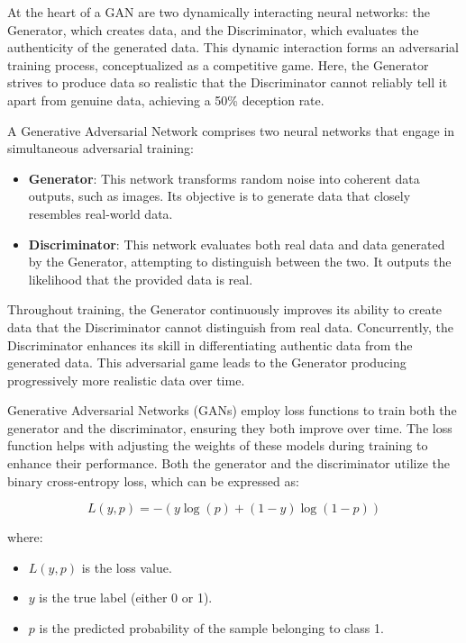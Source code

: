 \documentclass[12pt,a4paper]{report}
\begin{document}
At the heart of a GAN are two dynamically interacting neural networks: the Generator, which creates data, and the Discriminator, which evaluates the authenticity of the generated data. This dynamic interaction forms an adversarial training process, conceptualized as a competitive game. Here, the Generator strives to produce data so realistic that the Discriminator cannot reliably tell it apart from genuine data, achieving a 50\% deception rate.

A Generative Adversarial Network comprises two neural networks that engage in simultaneous adversarial training:

\begin{itemize}
  \item \textbf{Generator}: This network transforms random noise into coherent data outputs, such as images. Its objective is to generate data that closely resembles real-world data.
  \item \textbf{Discriminator}: This network evaluates both real data and data generated by the Generator, attempting to distinguish between the two. It outputs the likelihood that the provided data is real.
\end{itemize}

Throughout training, the Generator continuously improves its ability to create data that the Discriminator cannot distinguish from real data. Concurrently, the Discriminator enhances its skill in differentiating authentic data from the generated data. This adversarial game leads to the Generator producing progressively more realistic data over time.

Generative Adversarial Networks (GANs) employ loss functions to train both the generator and the discriminator, ensuring they both improve over time. The loss function helps with adjusting the weights of these models during training to enhance their performance. Both the generator and the discriminator utilize the binary cross-entropy loss, which can be expressed as:

\begin{equation}
  L(y, p) = - (y \log(p) + (1 - y) \log(1 - p))
\end{equation}

where:
\begin{itemize}
  \item \( L(y, p) \) is the loss value.
  \item \( y \) is the true label (either 0 or 1).
  \item \( p \) is the predicted probability of the sample belonging to class 1.
\end{itemize}
\end{document}
